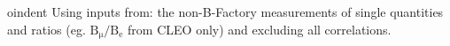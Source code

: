 
oindent Using inputs from: the non-B-Factory measurements of single quantities and ratios (eg. $\mathrm{B_\mu/B_e}$ from CLEO only) and excluding all correlations.
